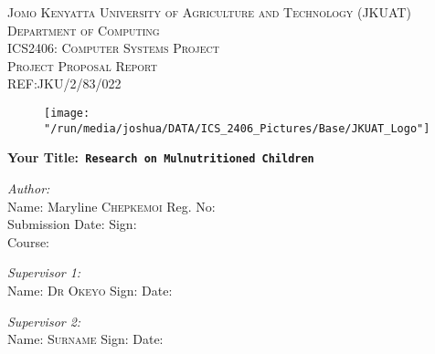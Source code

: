 \documentclass[12pt,svgnames,smaller]{article} %
\begin{document}
\begin{titlepage}
\begin{center}


\textsc{\large Jomo Kenyatta University of Agriculture and Technology (JKUAT)}\\[0.4cm]
\textsc{\large Department of Computing}\\[0.4cm]
\textsc{\large ICS2406: Computer Systems Project  }\\[0.3cm]
\textsc{\large Project Proposal Report }\\[0.3cm]
\textsc{\large REF:JKU/2/83/022 }\\[0.2 cm]
 
\begin{figure}  
\begin{center}  
\texttt{[image: "/run/media/joshua/DATA/ICS\_2406\_Pictures/Base/JKUAT\_Logo"]}
\end{center}
\end{figure}

\textbf{Your Title:\texttt{ Research on Mulnutritioned Children}}{\vspace*{20 mm}}
\end{center}

\begin{minipage}{1.0\textwidth}
\begin{flushleft} \large
\emph{Author:}\\
Name: Maryline \textsc{Chepkemoi} Reg. No: \hrulefill \\
Submission Date: \hrulefill  Sign: \hrulefill \\
Course: \hrulefill
\end{flushleft}
\end{minipage}

\begin{minipage}{1.0\textwidth}
\begin{flushleft} \large
\emph{Supervisor 1:} \\
Name: \hrulefill \textsc{Dr Okeyo} Sign: \hrulefill Date: \hrulefill
\end{flushleft}
\end{minipage}

\begin{minipage}{1.0\textwidth}
\begin{flushleft} \large
\emph{Supervisor 2:} \\
Name: \hrulefill \textsc{ Surname} Sign: \hrulefill Date: \hrulefill
\end{flushleft}
\end{minipage}


\end{titlepage}
\end{document}
